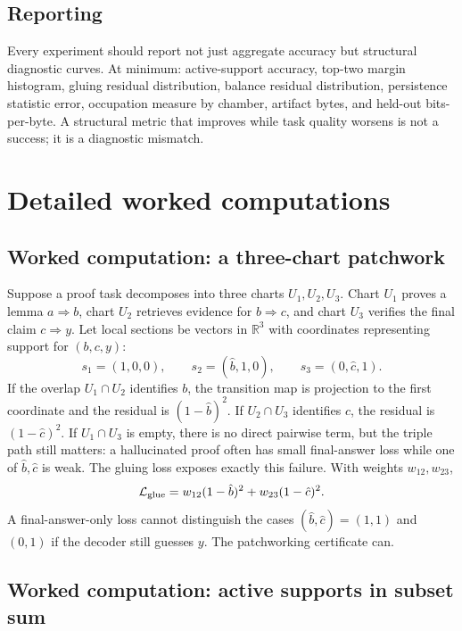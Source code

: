 \documentclass[11pt]{article}
\newcommand{\R}{\mathbb{R}}
\newcommand{\calL}{\mathcal{L}}
\begin{document}
\subsection{Reporting}

Every experiment should report not just aggregate accuracy but structural diagnostic curves.  At minimum: active-support accuracy, top-two margin histogram, gluing residual distribution, balance residual distribution, persistence statistic error, occupation measure by chamber, artifact bytes, and held-out bits-per-byte.  A structural metric that improves while task quality worsens is not a success; it is a diagnostic mismatch.


\section{Detailed worked computations}

\subsection{Worked computation: a three-chart patchwork}

Suppose a proof task decomposes into three charts \(U_1,U_2,U_3\).  Chart \(U_1\) proves a lemma \(a\Rightarrow b\), chart \(U_2\) retrieves evidence for \(b\Rightarrow c\), and chart \(U_3\) verifies the final claim \(c\Rightarrow y\).  Let local sections be vectors in \(\R^3\) with coordinates representing support for \((b,c,y)\):
\begin{equation}
s_1=(1,0,0),\qquad s_2=(\hat b,1,0),\qquad s_3=(0,\hat c,1).
\end{equation}
If the overlap \(U_1\cap U_2\) identifies \(b\), the transition map is projection to the first coordinate and the residual is \((1-\hat b)^2\).  If \(U_2\cap U_3\) identifies \(c\), the residual is \((1-\hat c)^2\).  If \(U_1\cap U_3\) is empty, there is no direct pairwise term, but the triple path still matters: a hallucinated proof often has small final-answer loss while one of \(\hat b,\hat c\) is weak.  The gluing loss exposes exactly this failure.  With weights \(w_{12},w_{23}\),
\begin{equation}
\calL_{\rm glue}=w_{12}(1-\hat b)^2+w_{23}(1-\hat c)^2.
\end{equation}
A final-answer-only loss cannot distinguish the cases \((\hat b,\hat c)=(1,1)\) and \((0,1)\) if the decoder still guesses \(y\).  The patchworking certificate can.

\subsection{Worked computation: active supports in subset sum}
\end{document}
